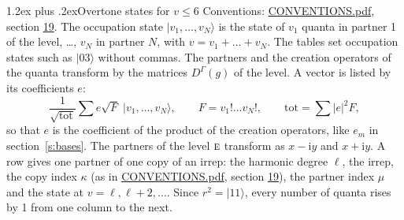 \documentclass[10pt,a4paper]{article}
\makeatletter
\renewcommand\section{\@startsection{section}{1}{\z@}{-3ex plus -1ex minus -.2ex}%
  {1.2ex plus .2ex}{\normalfont\large\sffamily\bfseries\color{parttitle}}}
\numberwithin{equation}{section}
\newcommand{\irr}[1]{\text{\normalfont\scshape #1}}
\newcommand{\iunit}{\mathrm{i}}
\newcommand{\repD}[1]{D^{#1}}
\newcommand{\mult}{\kappa}
\newcommand{\intx}{\mu}
\newcommand{\occ}[1]{\lvert #1\rangle}
\makeatother
\begin{document}
\section{Overtone states for \texorpdfstring{$v \le 6$}{v \textleq\ 6}}\label{s:overtone_states}
Conventions: \href{../../CONVENTIONS.pdf}{CONVENTIONS.pdf}, section \href{../../CONVENTIONS.pdf\#conv.19}{19}.
\leavevmode\label{n:vector.occupation}\label{n:local.quanta.partner}\label{n:local.weight.occupation}The occupation state $\occ{v_1, \dots, v_N}$ is the state of $v_1$ quanta in partner 1 of the level, \dots, $v_N$ in partner $N$, with $v = v_1 + \dots + v_N$. The tables set occupation states such as $\occ{03}$ without commas. The partners and the creation operators of the quanta transform by the matrices $\repD{\Gamma}(g)$ of the level. A vector is listed by its coefficients $e$:
\begin{equation}\label{e:occupation}\frac{1}{\sqrt{\mathrm{tot}}}\sum e\sqrt{F}\;\occ{v_1, \dots, v_N},\qquad F = v_1!\dots v_N!,\qquad \mathrm{tot} = \sum |e|^2F,\end{equation}
so that $e$ is the coefficient of the product of the creation operators, like $e_m$ in section~\ref{s:bases}. The partners of the level $\irr{e}$ transform as $x - \iunit y$ and $x + \iunit y$. A row gives one partner of one copy of an irrep: the harmonic degree $\ell$, the irrep, the copy index $\mult$ (as in \href{../../CONVENTIONS.pdf}{CONVENTIONS.pdf}, section \href{../../CONVENTIONS.pdf\#conv.19}{19}), the partner index $\intx$ and the state at $v = \ell, \ell + 2, \dots$. Since $r^2 = \occ{11}$, every number of quanta rises by 1 from one column to the next.
\end{document}
